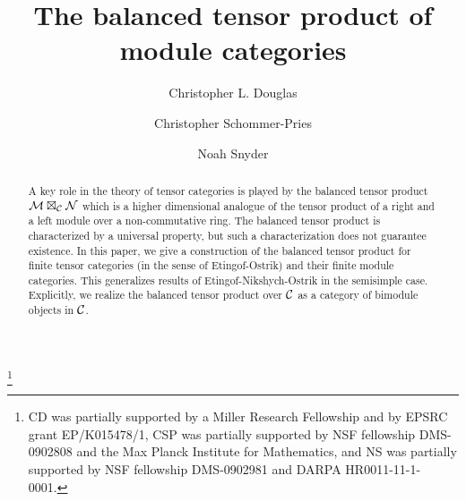\documentclass{amsart}
\begin{document}
\title{The balanced tensor product of module categories}

\begin{abstract}
A key role in the theory of tensor categories is played by the balanced tensor product $\mathcal M \boxtimes_\mathcal C \mathcal N$ which is a higher dimensional analogue of the tensor product of a right and a left module over a non-commutative ring.  The balanced tensor product is characterized by a universal property, but such a characterization does not guarantee existence.  In this paper, we give a construction of the balanced tensor product for finite tensor categories (in the sense of Etingof-Ostrik) and their finite module categories.  This generalizes results of Etingof-Nikshych-Ostrik in the semisimple case.  Explicitly, we realize the balanced tensor product over $\mathcal C$ as a category of bimodule objects in $\mathcal C$.
\end{abstract}

\author{Christopher L. Douglas}
\address{Mathematical Institute\\ University of Oxford\\ Oxford OX1 3LB\\ United Kingdom}
      	
\author{Christopher Schommer-Pries}
\address{Department of Mathematics\\ Max Planck Institute for Mathematics \\ 53111 Bonn \\ Germany}

\author{Noah Snyder}
\address{Department of Mathematics\\ Indiana University\\ Bloomington, IN 47401\\ USA}

\thanks{CD was partially supported by a Miller Research Fellowship and by EPSRC grant EP/K015478/1, CSP was partially supported by NSF fellowship DMS-0902808 and the Max Planck Institute for Mathematics, and NS was partially supported by NSF fellowship DMS-0902981 and DARPA HR0011-11-1-0001.
}


\maketitle	
\end{document}
